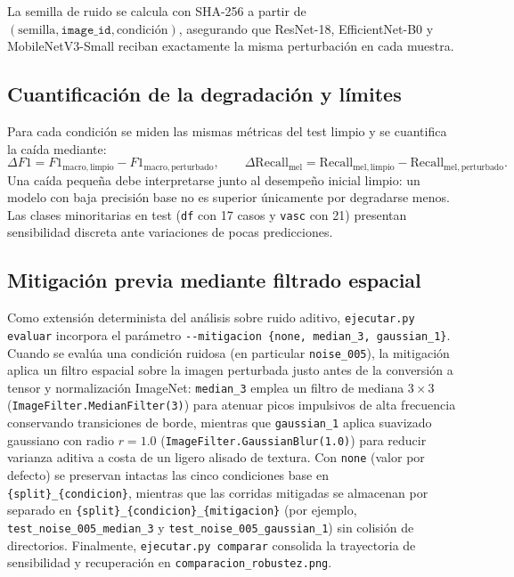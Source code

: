 La semilla de ruido se calcula con SHA-256 a partir de $(\text{semilla}, \texttt{image\_id}, \text{condición})$, asegurando que ResNet-18, EfficientNet-B0 y MobileNetV3-Small reciban exactamente la misma perturbación en cada muestra.


\subsection{Cuantificación de la degradación y límites}
Para cada condición se miden las mismas métricas del test limpio y se cuantifica la caída mediante:
\begin{equation}
\Delta F1 = F1_{\mathrm{macro,limpio}} - F1_{\mathrm{macro,perturbado}}, \qquad
\Delta \mathrm{Recall}_{\mathrm{mel}} = \mathrm{Recall}_{\mathrm{mel,limpio}} - \mathrm{Recall}_{\mathrm{mel,perturbado}}.
\end{equation}
Una caída pequeña debe interpretarse junto al desempeño inicial limpio: un modelo con baja precisión base no es superior únicamente por degradarse menos. Las clases minoritarias en test (\texttt{df} con 17 casos y \texttt{vasc} con 21) presentan sensibilidad discreta ante variaciones de pocas predicciones.

\subsection{Mitigación previa mediante filtrado espacial}
Como extensión determinista del análisis sobre ruido aditivo, \texttt{ejecutar.py evaluar} incorpora el parámetro \texttt{-{}-mitigacion \{none, median\_3, gaussian\_1\}}. Cuando se evalúa una condición ruidosa (en particular \texttt{noise\_005}), la mitigación aplica un filtro espacial sobre la imagen perturbada justo antes de la conversión a tensor y normalización ImageNet: \texttt{median\_3} emplea un filtro de mediana $3\times 3$ (\texttt{ImageFilter.MedianFilter(3)}) para atenuar picos impulsivos de alta frecuencia conservando transiciones de borde, mientras que \texttt{gaussian\_1} aplica suavizado gaussiano con radio $r=1.0$ (\texttt{ImageFilter.GaussianBlur(1.0)}) para reducir varianza aditiva a costa de un ligero alisado de textura. Con \texttt{none} (valor por defecto) se preservan intactas las cinco condiciones base en \texttt{\{split\}\_\{condicion\}}, mientras que las corridas mitigadas se almacenan por separado en \texttt{\{split\}\_\{condicion\}\_\{mitigacion\}} (por ejemplo, \texttt{test\_noise\_005\_median\_3} y \texttt{test\_noise\_005\_gaussian\_1}) sin colisión de directorios. Finalmente, \texttt{ejecutar.py comparar} consolida la trayectoria de sensibilidad y recuperación en \texttt{comparacion\_robustez.png}.
\FloatBarrier
